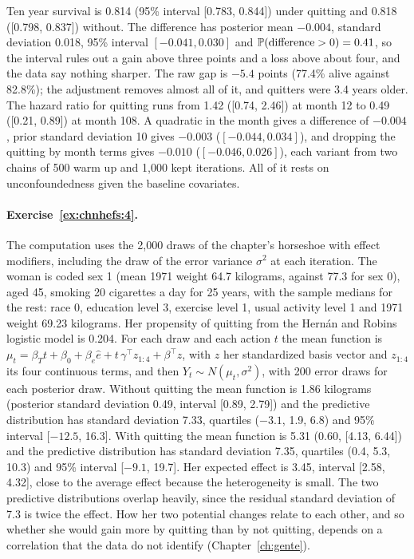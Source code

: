 Ten year survival is 0.814 (95\% interval [0.783, 0.844]) under quitting and 0.818 ([0.798, 0.837]) without. The difference has posterior mean $-0.004$, standard deviation 0.018, 95\% interval $[-0.041, 0.030]$ and $\mathbb{P}(\text{difference} > 0) = 0.41$, so the interval rules out a gain above three points and a loss above about four, and the data say nothing sharper. The raw gap is $-5.4$ points (77.4\% alive against 82.8\%); the adjustment removes almost all of it, and quitters were 3.4 years older. The hazard ratio for quitting runs from 1.42 ([0.74, 2.46]) at month 12 to 0.49 ([0.21, 0.89]) at month 108. A quadratic in the month gives a difference of $-0.004$, prior standard deviation 10 gives $-0.003$ ($[-0.044, 0.034]$), and dropping the quitting by month terms gives $-0.010$ ($[-0.046, 0.026]$), each variant from two chains of 500 warm up and 1,000 kept iterations. All of it rests on unconfoundedness given the baseline covariates.

\paragraph{Exercise~\ref{ex:chnhefs:4}.} The computation uses the 2,000 draws of the chapter's horseshoe with effect modifiers, including the draw of the error variance $\sigma^2$ at each iteration. The woman is coded sex 1 (mean 1971 weight 64.7 kilograms, against 77.3 for sex 0), aged 45, smoking 20 cigarettes a day for 25 years, with the sample medians for the rest: race 0, education level 3, exercise level 1, usual activity level 1 and 1971 weight 69.23 kilograms. Her propensity of quitting from the Hern\'an and Robins logistic model is 0.204. For each draw and each action $t$ the mean function is $\mu_t = \beta_T t + \beta_0 + \beta_e \hat e + t\,\gamma^\top z_{1:4} + \beta^\top z$, with $z$ her standardized basis vector and $z_{1:4}$ its four continuous terms, and then $Y_t \sim N(\mu_t, \sigma^2)$, with 200 error draws for each posterior draw. Without quitting the mean function is 1.86 kilograms (posterior standard deviation 0.49, interval [0.89, 2.79]) and the predictive distribution has standard deviation 7.33, quartiles ($-3.1$, 1.9, 6.8) and 95\% interval [$-12.5$, 16.3]. With quitting the mean function is 5.31 (0.60, [4.13, 6.44]) and the predictive distribution has standard deviation 7.35, quartiles (0.4, 5.3, 10.3) and 95\% interval [$-9.1$, 19.7]. Her expected effect is 3.45, interval [2.58, 4.32], close to the average effect because the heterogeneity is small. The two predictive distributions overlap heavily, since the residual standard deviation of 7.3 is twice the effect. How her two potential changes relate to each other, and so whether she would gain more by quitting than by not quitting, depends on a correlation that the data do not identify (Chapter~\ref{ch:gente}).

